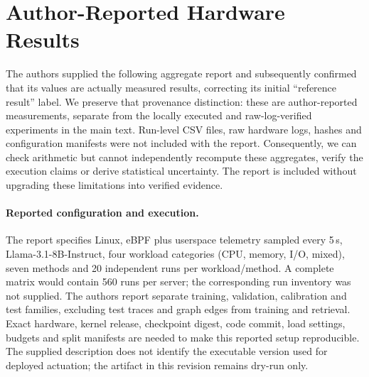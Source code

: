 \appendix
\section{Author-Reported Hardware Results}
\label{sec:reported-results}
The authors supplied the following aggregate report and subsequently confirmed that its values are actually measured results, correcting its initial ``reference result'' label. We preserve that provenance distinction: these are author-reported measurements, separate from the locally executed and raw-log-verified experiments in the main text. Run-level CSV files, raw hardware logs, hashes and configuration manifests were not included with the report. Consequently, we can check arithmetic but cannot independently recompute these aggregates, verify the execution claims or derive statistical uncertainty. The report is included without upgrading these limitations into verified evidence.

\paragraph{Reported configuration and execution.}
The report specifies Linux, eBPF plus userspace telemetry sampled every 5\,s, Llama-3.1-8B-Instruct, four workload categories (CPU, memory, I/O, mixed), seven methods and 20 independent runs per workload/method. A complete matrix would contain 560 runs per server; the corresponding run inventory was not supplied. The authors report separate training, validation, calibration and test families, excluding test traces and graph edges from training and retrieval. Exact hardware, kernel release, checkpoint digest, code commit, load settings, budgets and split manifests are needed to make this reported setup reproducible. The supplied description does not identify the executable version used for deployed actuation; the artifact in this revision remains dry-run only.

